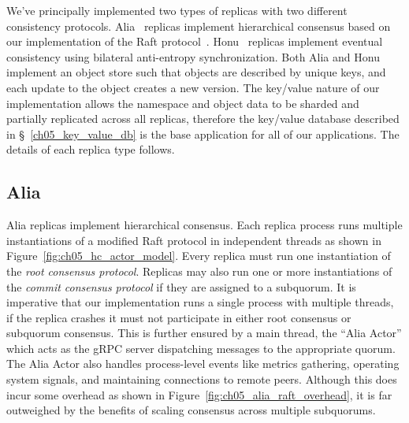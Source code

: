 We've principally implemented two types of replicas with two different consistency protocols.
Alia~\cite{alia} replicas implement hierarchical consensus based on our implementation of the Raft protocol~\cite{alia_raft}.
Honu~\cite{honu} replicas implement eventual consistency using bilateral anti-entropy synchronization.
Both Alia and Honu implement an object store such that objects are described by unique keys, and each update to the object creates a new version.
The key/value nature of our implementation allows the namespace and object data to be sharded and partially replicated across all replicas, therefore the key/value database described in \S~\ref{ch05_key_value_db} is the base application for all of our applications.
The details of each replica type follows.

\subsection{Alia}
\label{ch05_alia}

Alia replicas implement hierarchical consensus.
Each replica process runs multiple instantiations of a modified Raft protocol in independent threads as shown in Figure~\ref{fig:ch05_hc_actor_model}.
Every replica must run one instantiation of the \textit{root consensus protocol}.
Replicas may also run one or more instantiations of the \textit{commit consensus protocol} if they are assigned to a subquorum.
It is imperative that our implementation runs a single process with multiple threads, if the replica crashes it must not participate in either root consensus or subquorum consensus.
This is further ensured by a main thread, the ``Alia Actor'' which acts as the gRPC server dispatching messages to the appropriate quorum.
The Alia Actor also handles process-level events like metrics gathering, operating system signals, and maintaining connections to remote peers.
Although this does incur some overhead as shown in Figure~\ref{fig:ch05_alia_raft_overhead}, it is far outweighed by the benefits of scaling consensus across multiple subquorums.

